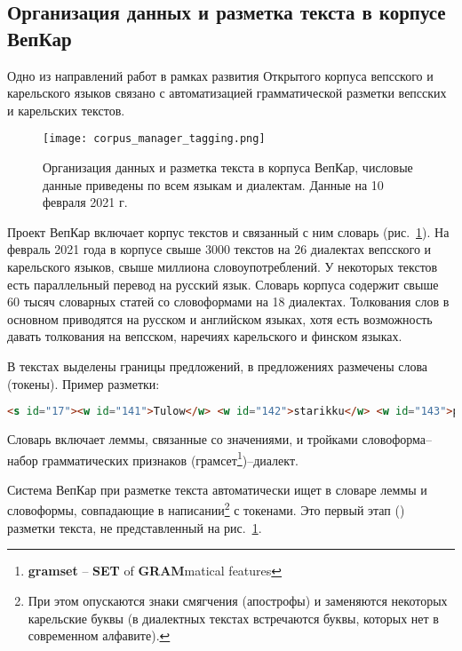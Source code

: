 
\subsection{Организация данных и разметка текста в корпусе ВепКар} \label{sect_exp_tag_vepkar_data_org}

Одно из направлений работ в рамках развития Открытого корпуса вепсского и карельского языков связано с автоматизацией грамматической разметки вепсских и карельских текстов. 

\begin{figure}
    \centering
    \texttt{[image: corpus\_manager\_tagging.png]}
\caption[Организация данных и разметка текста в корпуса ВепКар]{Организация 
данных и разметка текста в корпуса ВепКар, 
числовые данные приведены по всем языкам и диалектам. Данные на 10 февраля 2021 г.} \label{fig:corpus_manager_tagging}
\end{figure}

Проект ВепКар включает корпус текстов и связанный с ним словарь 
(рис.~\ref{fig:corpus_manager_tagging}). 
На февраль 2021 года в корпусе свыше 3000 текстов на 26 диалектах вепсского и карельского языков, свыше миллиона словоупотреблений. У некоторых текстов есть параллельный перевод на русский язык. Словарь корпуса содержит свыше 60 тысяч словарных статей со словоформами на 18 диалектах. Толкования слов в основном приводятся на русском и английском языках, хотя есть возможность давать толкования на вепсском, наречиях карельского и финском языках.

В текстах выделены границы предложений, в предложениях размечены слова (токены). 
Пример разметки:
\begin{lstlisting}[language=HTML]
<s id="17"><w id="141">Tulow</w> <w id="142">starikku</w> <w id="143">pertih</w>, <w id="144">tuattah</w> <w id="145">se</w>.</s>
\end{lstlisting}

Словарь включает леммы, связанные со значениями, и тройками словоформа--набор грамматических признаков (грамсет\footnote{ \textbf{gramset} -- \textbf{SET} of \textbf{GRAM}matical features})--диалект. 

Система ВепКар при разметке текста автоматически ищет в словаре 
леммы и словоформы, 
совпадающие в написании\footnote{При этом опускаются знаки смягчения (апострофы) 
и заменяются некоторых карельские буквы (в диалектных текстах встречаются буквы, 
которых нет в современном алфавите).
} 
с токенами. 
Это первый этап () разметки текста, не представленный на рис.~\ref{fig:corpus_manager_tagging}.  

